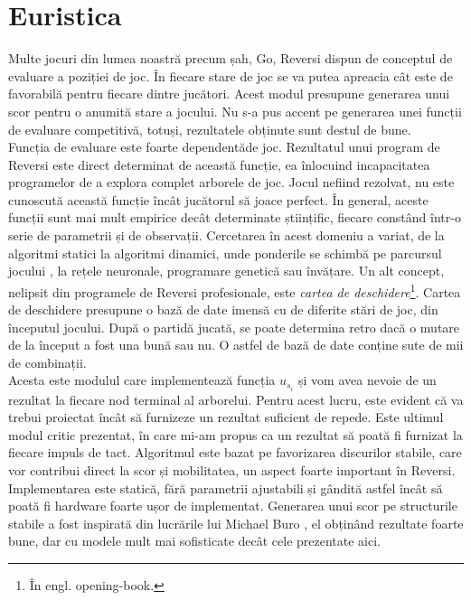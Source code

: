 \documentclass[12pt,twoside,a4paper,fleqn]{book}
\theoremstyle{definition}
\begin{document}
\section{Euristica}
\label{modul_heuristics}
Multe jocuri din lumea noastră precum șah, Go, Reversi dispun de conceptul de evaluare a poziției de joc. În fiecare stare de joc se va putea apreacia cât este de favorabilă pentru fiecare dintre jucători. Acest modul presupune generarea unui scor pentru o anumită stare a jocului. Nu s-a pus accent pe generarea unei funcții de evaluare competitivă, totuși, rezultatele obținute sunt destul de bune.\\
Funcția de evaluare este foarte dependentăde joc. Rezultatul unui program de Reversi este direct determinat de această funcție, ea înlocuind incapacitatea programelor de a explora complet arborele de joc. Jocul nefiind rezolvat, nu este cunoscută această funcție încât jucătorul să joace perfect. În general, aceste funcții sunt mai mult empirice decât determinate științific, fiecare constând într-o serie de parametrii și de observații. Cercetarea în acest domeniu a variat, de la algoritmi statici la algoritmi dinamici, unde ponderile se schimbă pe parcursul jocului \cite{buro}, la rețele neuronale, programare genetică sau învățare\cite{buro_learning}. Un alt concept, nelipsit din programele de Reversi profesionale, este \emph{cartea de deschidere}\footnote{În engl. opening-book.}\cite{buro_opening}. Cartea de deschidere presupune o bază de date imensă cu de diferite stări de joc, din începutul jocului. După o partidă jucată, se poate determina retro dacă o mutare de la început a fost una bună sau nu. O astfel de bază de date conține sute de mii de combinații.\\
Acesta este modulul care implementează funcția $u_{s_{i}}$ și vom avea nevoie de un rezultat la fiecare nod terminal al arborelui. Pentru acest lucru, este evident că va trebui proiectat încât să furnizeze un rezultat suficient de repede. Este ultimul modul critic prezentat, în care mi-am propus ca un rezultat să poată fi furnizat la fiecare impuls de tact. Algoritmul este bazat pe favorizarea discurilor stabile, care vor contribui direct la scor și mobilitatea, un aspect foarte important în Reversi. Implementarea este statică, fără parametrii ajustabili și gândită astfel încât să poată fi hardware foarte ușor de implementat. Generarea unui scor pe structurile stabile a fost inspirată din lucrările lui Michael Buro \cite{buro}, el obținând rezultate foarte bune, dar cu modele mult mai sofisticate decât cele prezentate aici.
\end{document}
